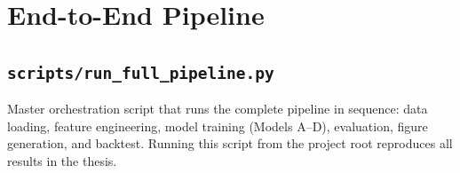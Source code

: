 \documentclass[11pt, a4paper, oneside]{report}
\begin{document}
\chapter{End-to-End Pipeline}

\section{\texttt{scripts/run\_full\_pipeline.py}}

Master orchestration script that runs the complete pipeline in sequence:
data loading, feature engineering, model training (Models A--D),
evaluation, figure generation, and backtest. Running this script from
the project root reproduces all results in the thesis.


\end{document}
